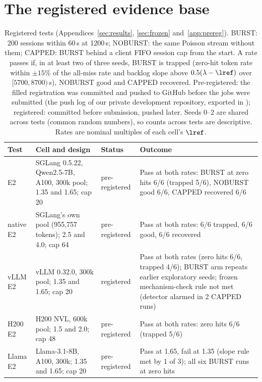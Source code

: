 \section{The registered evidence base}\label{sec:evidence}

\begin{table}[t]
\centering\footnotesize
\caption{Registered tests (Appendices~\ref{sec:results}, \ref{sec:frozen} and~\ref{app:prereg}). BURST: 200 sessions within 60\,s at
1200\,s; NOBURST: the same Poisson stream without them; CAPPED: BURST behind a client FIFO session cap from the start. A rate passes
if, in at least two of three seeds, BURST is trapped (zero-hit token rate within $\pm15$\% of the all-miss rate and backlog slope
above $0.5(\lambda-\lref)$ over $[5700,8700)$\,s), NOBURST good and CAPPED recovered. Pre-registered: the filled registration was
committed and pushed to GitHub before the jobs were submitted (the push log of our private development repository, exported in
); registered: committed before submission, pushed later. Seeds 0--2 are shared across tests (common random
numbers), so counts across tests are descriptive. Rates are nominal multiples of each cell's $\lref$.}\label{tab:evidence}
\setlength{\tabcolsep}{3pt}
\begin{tabular}{@{}>{\raggedright\arraybackslash}p{2.6cm} >{\raggedright\arraybackslash}p{5.0cm} >{\raggedright\arraybackslash}p{1.9cm} >{\raggedright\arraybackslash}p{7.3cm}@{}}
\toprule
Test & Cell and design & Status & Outcome\\
\midrule
E2 & SGLang 0.5.22, Qwen2.5-7B, A100, 300k pool; 1.35 and 1.65; cap 20 & pre-registered & Pass at both rates: BURST at zero hits 6/6 (trapped 5/6), NOBURST good 6/6, CAPPED recovered 6/6\\
native E2 & SGLang's own pool (955,757 tokens); 2.5 and 4.0; cap 64 & pre-registered & Pass at both rates: 6/6 trapped, 6/6 good, 6/6 recovered\\
vLLM E2 & vLLM 0.32.0, 300k pool; 1.35 and 1.65; cap 20 & registered & Pass at both rates (zero hits 6/6, trapped 4/6); BURST arm repeats earlier exploratory seeds; frozen mechanism-check rule not met (detector alarmed in 2 CAPPED runs)\\
H200 E2 & H200 NVL, 600k pool; 1.5 and 2.0; cap 48 & pre-registered & Pass at both rates: zero hits 6/6 (trapped 5/6)\\
Llama E2 & Llama-3.1-8B, A100, 300k; 1.35 and 1.65; cap 20 & pre-registered & Pass at 1.65, fail at 1.35 (slope rule met by 1 of 3); all six BURST runs at zero hits\\

\end{tabular}
\end{table}
